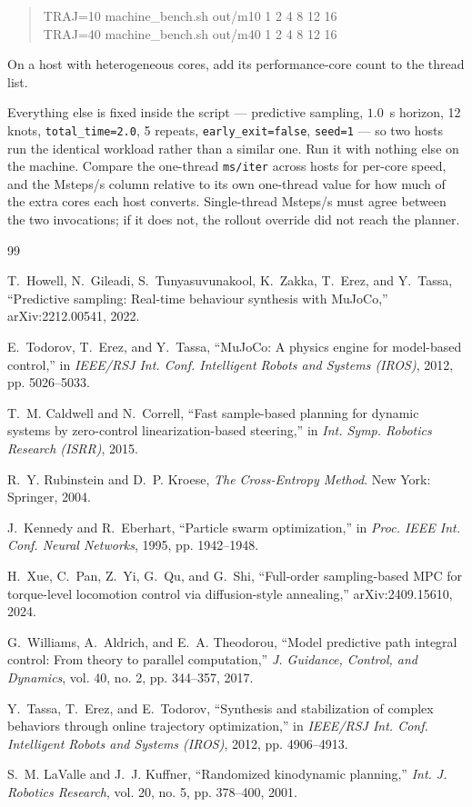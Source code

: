 \documentclass[conference]{IEEEtran}
\begin{document}
\begin{quote}\footnotesize\ttfamily
TRAJ=10 machine\_bench.sh out/m10 1 2 4 8 12 16 \\
TRAJ=40 machine\_bench.sh out/m40 1 2 4 8 12 16
\end{quote}

\noindent On a host with heterogeneous cores, add its performance-core count to
the thread list.

\noindent Everything else is fixed inside the script --- predictive sampling,
$1.0$~s horizon, 12 knots, \texttt{total\_time=2.0}, 5 repeats,
\texttt{early\_exit=false}, \texttt{seed=1} --- so two hosts run the identical
workload rather than a similar one. Run it with nothing else on the machine.
Compare the one-thread \texttt{ms/iter} across hosts for per-core speed, and the
Msteps/s column relative to its own one-thread value for how much of the extra
cores each host converts. Single-thread Msteps/s must agree between the two
invocations; if it does not, the rollout override did not reach the planner.

\begin{thebibliography}{99}

T.~Howell, N.~Gileadi, S.~Tunyasuvunakool, K.~Zakka, T.~Erez, and Y.~Tassa,
``Predictive sampling: Real-time behaviour synthesis with MuJoCo,''
arXiv:2212.00541, 2022.

E.~Todorov, T.~Erez, and Y.~Tassa, ``MuJoCo: A physics engine for model-based
control,'' in \emph{IEEE/RSJ Int. Conf. Intelligent Robots and Systems
(IROS)}, 2012, pp. 5026--5033.

T.~M. Caldwell and N.~Correll, ``Fast sample-based planning for dynamic systems
by zero-control linearization-based steering,'' in \emph{Int. Symp. Robotics
Research (ISRR)}, 2015.

R.~Y. Rubinstein and D.~P. Kroese, \emph{The Cross-Entropy Method}.
New York: Springer, 2004.

J.~Kennedy and R.~Eberhart, ``Particle swarm optimization,'' in \emph{Proc.
IEEE Int. Conf. Neural Networks}, 1995, pp. 1942--1948.

H.~Xue, C.~Pan, Z.~Yi, G.~Qu, and G.~Shi, ``Full-order sampling-based MPC for
torque-level locomotion control via diffusion-style annealing,''
arXiv:2409.15610, 2024.

G.~Williams, A.~Aldrich, and E.~A. Theodorou, ``Model predictive path integral
control: From theory to parallel computation,'' \emph{J. Guidance, Control, and
Dynamics}, vol. 40, no. 2, pp. 344--357, 2017.

Y.~Tassa, T.~Erez, and E.~Todorov, ``Synthesis and stabilization of complex
behaviors through online trajectory optimization,'' in \emph{IEEE/RSJ Int.
Conf. Intelligent Robots and Systems (IROS)}, 2012, pp. 4906--4913.

S.~M. LaValle and J.~J. Kuffner, ``Randomized kinodynamic planning,''
\emph{Int. J. Robotics Research}, vol. 20, no. 5, pp. 378--400, 2001.

\end{thebibliography}
\end{document}
